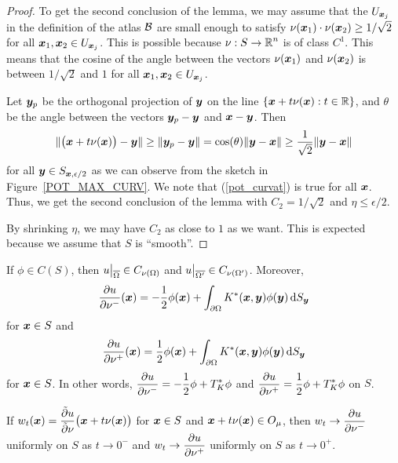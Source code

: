 \begin{proof}
To get the second conclusion of the lemma, we may assume that the
$U_{{\bm{x}}_j}$ in the definition of the atlas $\mathcal{B}$ are small enough
to satisfy 
$\nu({\bm{x}}_1)\cdot \nu({\bm{x}}_2) \geq 1/\sqrt{2}$ for all
${\bm{x}}_1,{\bm{x}}_2 \in U_{{\bm{x}}_j}$.  This is possible because
$\displaystyle \nu:S \to \mathbb{R}^n$ is of class $C^1$.  This means that
the cosine of the angle between the vectors
$\nu({\bm{x}}_1)$ and $\nu({\bm{x}}_2)$ is between $1/\sqrt{2}$ and
$1$ for all ${\bm{x}}_1,{\bm{x}}_2 \in U_{{\bm{x}}_j}$.

Let ${\bm{y}}_p$ be the orthogonal projection of ${\bm{y}}$ on the line
$\displaystyle \left\{{\bm{x}} + t\nu({\bm{x}}) : t \in \mathbb{R} \right\}$,
and $\theta$ be the angle between the vectors ${\bm{y}}_p - {\bm{y}}$ and
${\bm{x}}- {\bm{y}}$.  Then
\begin{equation} \label{pot_curvat}
\| \big({\bm{x}} + t\nu({\bm{x}})\big)-{\bm{y}} \|
\geq \|{\bm{y}}_p - {\bm{y}}\| = \cos(\theta)
\|{\bm{y}}-{\bm{x}}\| \geq \frac{1}{\sqrt{2}} \|{\bm{y}}-{\bm{x}}\|
\end{equation}
for all ${\bm{y}} \in S_{{\bm{x}},\epsilon/2}$ as we can observe from
the sketch in Figure~\ref{POT_MAX_CURV}.    We note that
(\ref{pot_curvat}) is true for all ${\bm{x}}$.  Thus, we get the second
conclusion of the lemma with $C_2 = 1/\sqrt{2}$ and $\eta \leq \epsilon/2$.

By shrinking $\eta$, we may have $C_2$ as close to $1$ as we want.
This is expected because we assume that $S$ is ``smooth''.
\end{proof}


\begin{theorem} \label{pot_slp_exist}
If $\phi \in C(S)$, then
$\displaystyle u\big|_{\overline{\Omega}} \in C_{\nu(\Omega)}$ and
$\displaystyle u\big|_{\overline{\Omega^{\prime}}} \in
C_{\nu(\Omega^{\prime})}$.
Moreover,
\[
\frac{\partial{u}}{\partial \nu^-}({\bm{x}}) = -\frac{1}{2} \phi({\bm{x}}) +
\int_{\partial \Omega} K^\ast({\bm{x}},{\bm{y}}) \phi({\bm{y}}) \,\mathrm{d}{S}_{{\bm{y}}}
\]
for ${\bm{x}} \in S$ and
\[
\frac{\partial{u}}{\partial \nu^+}({\bm{x}}) = \frac{1}{2} \phi({\bm{x}}) +
\int_{\partial \Omega} K^\ast({\bm{x}},{\bm{y}}) \phi({\bm{y}}) \,\mathrm{d}{S}_{{\bm{y}}}
\]
for ${\bm{x}} \in S$.  In other words,
$\displaystyle \frac{\partial{u}}{\partial \nu^-} = -\frac{1}{2} \phi + T^\ast_K \phi$
and
$\displaystyle \frac{\partial{u}}{\partial \nu^+} = \frac{1}{2} \phi + T^\ast_K \phi$
on $S$.

If $\displaystyle
w_t({\bm{x}}) = \frac{\tilde{\partial}{u}}{\tilde{\partial}{\nu}}\big({\bm{x}}+t\nu({\bm{x}})\big)$
for ${\bm{x}} \in S$ and ${\bm{x}} + t \nu({\bm{x}}) \in O_\mu$,
then $\displaystyle w_t \rightarrow \frac{\partial{u}}{\partial \nu^-}$ uniformly
on $S$ as $t\rightarrow 0^-$ and
$\displaystyle w_t \rightarrow \frac{\partial{u}}{\partial \nu^+}$ uniformly on
$S$ as $t\rightarrow 0^+$.
\end{theorem}

